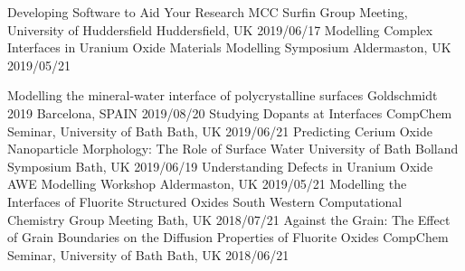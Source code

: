 \vspace{-0.4cm}
\begin{cvhonors}
  \cvhonor
    {Developing Software to Aid Your Research}
    {MCC Surfin Group Meeting, University of Huddersfield}
    {Huddersfield, UK}
    {2019/06/17}
  \cvhonor
    {Modelling Complex Interfaces in Uranium Oxide}
    {Materials Modelling Symposium}
    {Aldermaston, UK}
    {2019/05/21}
\end{cvhonors}
\begin{cvhonors}
  \cvhonor
    {Modelling the mineral-water interface of polycrystalline
    surfaces}
    {Goldschmidt 2019}
    {Barcelona, SPAIN}
    {2019/08/20}
  \cvhonor
  	{Studying Dopants at Interfaces}
    {CompChem Seminar, University of Bath}
    {Bath, UK}
    {2019/06/21}
  \cvhonor
    {Predicting Cerium Oxide Nanoparticle Morphology:
    The Role of Surface Water}
    {University of Bath Bolland Symposium}
    {Bath, UK}
    {2019/06/19}
  \cvhonor
    {Understanding Defects in Uranium Oxide}
    {AWE Modelling Workshop}
    {Aldermaston, UK}
    {2019/05/21}
  \cvhonor
    {Modelling the Interfaces of Fluorite Structured Oxides}
    {South Western Computational Chemistry Group Meeting}
    {Bath, UK}
    {2018/07/21}
  \cvhonor
    {Against the Grain: The Effect of Grain Boundaries on the Diffusion Properties of Fluorite Oxides}
    {CompChem Seminar, University of Bath}
    {Bath, UK}
    {2018/06/21}   
\end{cvhonors}
